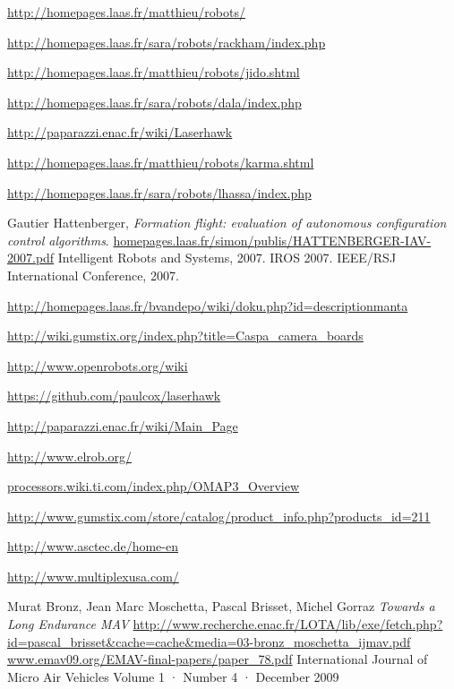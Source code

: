 \documentclass[a4paper,11pt]{report}
\begin{document}
\begin{thebibliography}{9}

  \url{http://homepages.laas.fr/matthieu/robots/}


  \url{http://homepages.laas.fr/sara/robots/rackham/index.php}

  \url{http://homepages.laas.fr/matthieu/robots/jido.shtml}

  \url{http://homepages.laas.fr/sara/robots/dala/index.php}

  \url{http://paparazzi.enac.fr/wiki/Laserhawk}

  \url{http://homepages.laas.fr/matthieu/robots/karma.shtml}

  \url{http://homepages.laas.fr/sara/robots/lhassa/index.php}

  Gautier Hattenberger,
  \emph{Formation flight: evaluation of autonomous configuration control algorithms}.
  \url{homepages.laas.fr/simon/publis/HATTENBERGER-IAV-2007.pdf}
  Intelligent Robots and Systems, 2007. IROS 2007. IEEE/RSJ International Conference, 
  2007.

  \url{http://homepages.laas.fr/bvandepo/wiki/doku.php?id=descriptionmanta}

  \url{http://wiki.gumstix.org/index.php?title=Caspa_camera_boards}

  \url{http://www.openrobots.org/wiki}

  \url{https://github.com/paulcox/laserhawk}

  \url{http://paparazzi.enac.fr/wiki/Main_Page}

  \url{http://www.elrob.org/}

  \url{processors.wiki.ti.com/index.php/OMAP3_Overview}

  \url{http://www.gumstix.com/store/catalog/product_info.php?products_id=211}

  \url{http://www.asctec.de/home-en}

  \url{http://www.multiplexusa.com/}

  Murat Bronz, Jean Marc Moschetta, Pascal Brisset, Michel Gorraz
  \emph{Towards a Long Endurance MAV}
  \url{http://www.recherche.enac.fr/LOTA/lib/exe/fetch.php?id=pascal_brisset&cache=cache&media=03-bronz_moschetta_ijmav.pdf}
  \url{www.emav09.org/EMAV-final-papers/paper_78.pdf}
  International Journal of Micro Air Vehicles
  Volume 1 · Number 4 · December 2009


\end{thebibliography}
\end{document}
